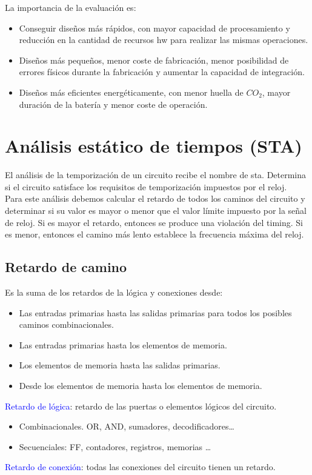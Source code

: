 La importancia de la evaluación es:
\begin{itemize}
	\item Conseguir diseños más rápidos, con mayor capacidad de procesamiento y reducción en la cantidad de recursos \gls{hw} para realizar las mismas operaciones.
	\item Diseños más pequeños, menor coste de fabricación, menor posibilidad de errores físicos durante la fabricación y aumentar la capacidad de integración.
	\item Diseños más eficientes energéticamente, con menor huella de $CO_{2}$, mayor duración de la batería y menor coste de operación.
\end{itemize}

\section{Análisis estático de tiempos (STA)}
El análisis de la temporización de un circuito recibe el nombre de \gls{sta}. Determina si el circuito satisface los requisitos de temporización impuestos por el reloj.
\\ Para este análisis debemos calcular el retardo de todos los caminos del circuito y determinar si su valor es mayor o menor que el valor límite impuesto por la señal de reloj. Si es mayor el retardo, entonces se produce una violación del timing. Si es menor, entonces el camino más lento establece la frecuencia máxima del reloj.

\subsection{Retardo de camino}
Es la suma de los retardos de la lógica y conexiones desde:
\begin{itemize}
	\item Las entradas primarias hasta las salidas primarias para todos los posibles caminos combinacionales.
	\item Las entradas primarias hasta los elementos de memoria.
	\item Los elementos de memoria hasta las salidas primarias.
	\item Desde los elementos de memoria hasta los elementos de memoria.
\end{itemize}
\textcolor{blue}{Retardo de lógica}: retardo de las puertas o elementos lógicos del circuito.
\begin{itemize}
	\item Combinacionales. OR, AND, sumadores, decodificadores\dots
	\item Secuenciales: FF, contadores, registros, memorias \dots
\end{itemize}
\textcolor{blue}{Retardo de conexión}: todas las conexiones del circuito tienen un retardo.


